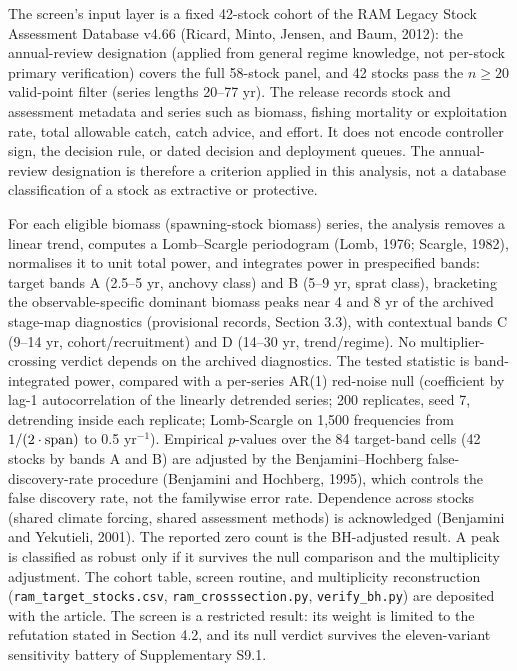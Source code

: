 \documentclass[11pt]{article}
\begin{document}
The screen's input layer is a fixed 42-stock cohort of the RAM Legacy
Stock Assessment Database v4.66 (Ricard, Minto, Jensen, and Baum, 2012): the annual-review designation (applied from general regime knowledge, not per-stock primary verification) covers the full 58-stock panel, and 42 stocks pass the \(n\ge 20\) valid-point filter (series lengths 20--77 yr). The release
records stock and assessment metadata and series such as biomass,
fishing mortality or exploitation rate, total allowable catch, catch
advice, and effort. It does not encode controller sign, the decision
rule, or dated decision and deployment queues. The annual-review
designation is therefore a criterion applied in this analysis, not a
database classification of a stock as extractive or protective.

For each eligible biomass (spawning-stock biomass) series, the analysis
removes a linear trend, computes a Lomb--Scargle periodogram (Lomb, 1976;
Scargle, 1982), normalises it to unit total power, and integrates power in
prespecified bands: target bands A (2.5--5 yr, anchovy class) and B (5--9 yr,
sprat class), bracketing the observable-specific dominant biomass peaks near 4 and
8 yr of the archived stage-map diagnostics (provisional records, Section 3.3), with contextual bands C (9--14 yr, cohort/recruitment) and D (14--30 yr, trend/regime). No multiplier-crossing verdict depends on the archived diagnostics. The tested
statistic is band-integrated power, compared with a per-series AR(1) red-noise
null (coefficient by lag-1 autocorrelation of the linearly detrended series; 200 replicates, seed 7, detrending inside each replicate; Lomb-Scargle on 1,500 frequencies from \(1/(2\cdot{\rm span})\) to 0.5 yr\(^{-1}\)). Empirical
\(p\)-values over the 84 target-band cells (42 stocks by bands A and B) are
adjusted by the Benjamini--Hochberg false-discovery-rate procedure (Benjamini
and Hochberg, 1995), which controls the false discovery rate, not the
familywise error rate. Dependence across stocks (shared climate forcing,
shared assessment methods) is acknowledged (Benjamini and Yekutieli,
2001). The reported zero count is the
BH-adjusted result. A peak is classified as robust only if it survives the
null comparison and the multiplicity adjustment. The cohort table, screen
routine, and multiplicity reconstruction (\texttt{ram\_target\_stocks.csv},
\texttt{ram\_crosssection.py}, \texttt{verify\_bh.py}) are deposited with
the article. The screen is a restricted result: its weight is limited to
the refutation stated in Section 4.2, and its null verdict survives the
eleven-variant sensitivity battery of Supplementary S9.1.
\end{document}
